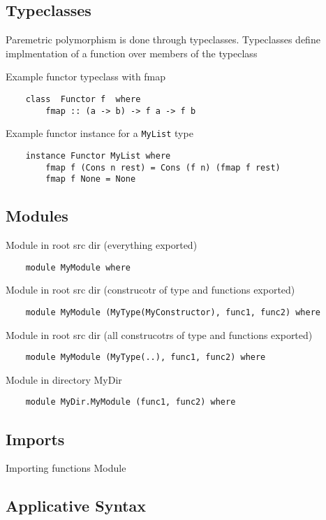 \documentclass{article}
\begin{document}
\subsection{Typeclasses}
Paremetric polymorphism is done through typeclasses. Typeclasses define
implmentation of a function over members of the typeclass
\bigskip

Example functor typeclass with fmap
\begin{verbatim}
    class  Functor f  where
        fmap :: (a -> b) -> f a -> f b
\end{verbatim}

Example functor instance for a \verb|MyList| type
\begin{verbatim}
    instance Functor MyList where
        fmap f (Cons n rest) = Cons (f n) (fmap f rest)
        fmap f None = None
    \end{verbatim}
\FloatBarrier

\subsection{Modules}
Module in root src dir (everything exported)
    \begin{verbatim}
    module MyModule where
    \end{verbatim}
Module in root src dir (construcotr of type and functions exported)
    \begin{verbatim}
    module MyModule (MyType(MyConstructor), func1, func2) where
    \end{verbatim}
Module in root src dir (all construcotrs of type and functions exported)
    \begin{verbatim}
    module MyModule (MyType(..), func1, func2) where
    \end{verbatim}
Module in directory MyDir
    \begin{verbatim}
    module MyDir.MyModule (func1, func2) where
    \end{verbatim}
\subsection{Imports}
Importing functions Module

\subsection{Applicative Syntax}


\appendix
\end{document}
